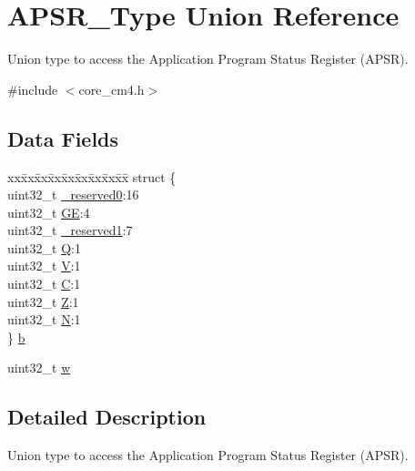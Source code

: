 \hypertarget{union_a_p_s_r___type}{}\section{A\+P\+S\+R\+\_\+\+Type Union Reference}
\label{union_a_p_s_r___type}


Union type to access the Application Program Status Register (A\+P\+SR).  




{\ttfamily \#include $<$core\+\_\+cm4.\+h$>$}

\subsection*{Data Fields}
\begin{DoxyCompactItemize}
\item 
\begin{tabbing}
xx\=xx\=xx\=xx\=xx\=xx\=xx\=xx\=xx\=\kill
struct \{\\
\>uint32\_t \hyperlink{union_a_p_s_r___type_ac8a6a13838a897c8d0b8bc991bbaf7c1}{\_reserved0}:16\\
\>uint32\_t \hyperlink{union_a_p_s_r___type_aa91800ec6e90e457c7a1acd1f2e17099}{GE}:4\\
\>uint32\_t \hyperlink{union_a_p_s_r___type_a959a73d8faee56599b7e792a7c5a2d16}{\_reserved1}:7\\
\>uint32\_t \hyperlink{union_a_p_s_r___type_a65f27ddc4f7e09c14ce7c5211b2e000a}{Q}:1\\
\>uint32\_t \hyperlink{union_a_p_s_r___type_acd4a2b64faee91e4a9eef300667fa222}{V}:1\\
\>uint32\_t \hyperlink{union_a_p_s_r___type_a7a1caf92f32fe9ebd8d1fe89b06c7776}{C}:1\\
\>uint32\_t \hyperlink{union_a_p_s_r___type_a5ae954cbd9986cd64625d7fa00943c8e}{Z}:1\\
\>uint32\_t \hyperlink{union_a_p_s_r___type_abae0610bc2a97bbf7f689e953e0b451f}{N}:1\\
\} \hyperlink{union_a_p_s_r___type_a2e5b85cff450c7f92c7388dd09f10065}{b}\\

\end{tabbing}\item 
uint32\+\_\+t \hyperlink{union_a_p_s_r___type_ad0fb62e7a08e70fc5e0a76b67809f84b}{w}
\end{DoxyCompactItemize}


\subsection{Detailed Description}
Union type to access the Application Program Status Register (A\+P\+SR). 

